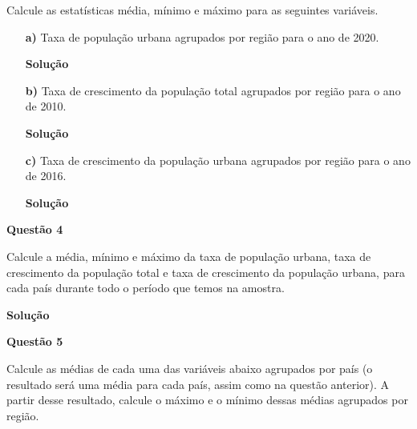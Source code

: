 \documentclass[12pt, a4paper]{article}
\begin{document}
Calcule as estatísticas média, mínimo e máximo para as seguintes variáveis.

\begin{itemize}
	\item[\textbf{a)}] Taxa de população urbana agrupados por região para o ano de 2020.
	
	
	\textbf{Solução}
	
	
	
	
	
	\item[\textbf{b)}] Taxa de crescimento da população total agrupados por região para o ano de 2010.
	
	
	\textbf{Solução}
	
	
	
	
	
	\item[\textbf{c)}] Taxa de crescimento da população urbana agrupados por região para o ano de 2016.
	
	
	\textbf{Solução}
	
	
	
	
	
\end{itemize}



\textbf{Questão 4}

Calcule a média, mínimo e máximo da taxa de população urbana, taxa de crescimento da população total e taxa de crescimento da população urbana, para cada país durante todo o período que temos na amostra.



\textbf{Solução}





\textbf{Questão 5}

Calcule as médias de cada uma das variáveis abaixo agrupados por país (o resultado será uma média para cada país, assim como na questão anterior). A partir desse resultado, calcule o máximo e o mínimo dessas médias agrupados por região.
\end{document}

